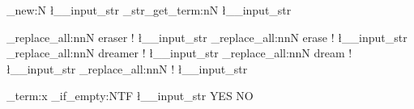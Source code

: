 \documentclass{article}
\begin{document}
\ExplSyntaxOn

\str_new:N \l__input_str
\ior_str_get_term:nN {}{\l__input_str}

\regex_replace_all:nnN { eraser }  { ! } \l__input_str
\regex_replace_all:nnN { erase }   { ! } \l__input_str
\regex_replace_all:nnN { dreamer } { ! } \l__input_str
\regex_replace_all:nnN { dream }   { ! } \l__input_str
\regex_replace_all:nnN { ! } {} \l__input_str

\iow_term:x { \str_if_empty:NTF { \l__input_str }{ YES }{ NO } }

\ExplSyntaxOff
\end{document}
